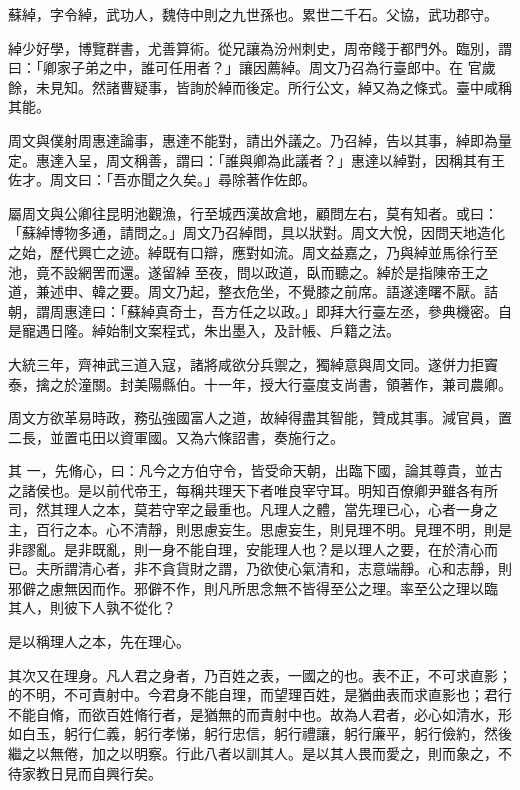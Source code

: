 \begin{pinyinscope}
 蘇綽，字令綽，武功人，魏侍中則之九世孫也。累世二千石。父協，武功郡守。



 綽少好學，博覽群書，尤善算術。從兄讓為汾州刺史，周帝餞于都門外。臨別，謂曰：「卿家子弟之中，誰可任用者？」讓因薦綽。周文乃召為行臺郎中。在
 官歲餘，未見知。然諸曹疑事，皆詢於綽而後定。所行公文，綽又為之條式。臺中咸稱其能。



 周文與僕射周惠達論事，惠達不能對，請出外議之。乃召綽，告以其事，綽即為量定。惠達入呈，周文稱善，謂曰：「誰與卿為此議者？」惠達以綽對，因稱其有王佐才。周文曰：「吾亦聞之久矣。」尋除著作佐郎。



 屬周文與公卿往昆明池觀漁，行至城西漢故倉地，顧問左右，莫有知者。或曰：「蘇綽博物多通，請問之。」周文乃召綽問，具以狀對。周文大悅，因問天地造化之始，歷代興亡之迹。綽既有口辯，應對如流。周文益嘉之，乃與綽並馬徐行至池，竟不設網罟而還。遂留綽
 至夜，問以政道，臥而聽之。綽於是指陳帝王之道，兼述申、韓之要。周文乃起，整衣危坐，不覺膝之前席。語遂達曙不厭。詰朝，謂周惠達曰：「蘇綽真奇士，吾方任之以政。」即拜大行臺左丞，參典機密。自是寵遇日隆。綽始制文案程式，朱出墨入，及計帳、戶籍之法。



 大統三年，齊神武三道入寇，諸將咸欲分兵禦之，獨綽意與周文同。遂併力拒竇泰，擒之於潼關。封美陽縣伯。十一年，授大行臺度支尚書，領著作，兼司農卿。



 周文方欲革易時政，務弘強國富人之道，故綽得盡其智能，贊成其事。減官員，置二長，並置屯田以資軍國。又為六條詔書，奏施行之。



 其
 一，先脩心，曰：凡今之方伯守令，皆受命天朝，出臨下國，論其尊貴，並古之諸侯也。是以前代帝王，每稱共理天下者唯良宰守耳。明知百僚卿尹雖各有所司，然其理人之本，莫若守宰之最重也。凡理人之體，當先理已心，心者一身之主，百行之本。心不清靜，則思慮妄生。思慮妄生，則見理不明。見理不明，則是非謬亂。是非既亂，則一身不能自理，安能理人也？是以理人之要，在於清心而已。夫所謂清心者，非不貪貨財之謂，乃欲使心氣清和，志意端靜。心和志靜，則邪僻之慮無因而作。邪僻不作，則凡所思念無不皆得至公之理。率至公之理以臨
 其人，則彼下人孰不從化？



 是以稱理人之本，先在理心。



 其次又在理身。凡人君之身者，乃百姓之表，一國之的也。表不正，不可求直影；的不明，不可責射中。今君身不能自理，而望理百姓，是猶曲表而求直影也；君行不能自脩，而欲百姓脩行者，是猶無的而責射中也。故為人君者，必心如清水，形如白玉，躬行仁義，躬行孝悌，躬行忠信，躬行禮讓，躬行廉平，躬行儉約，然後繼之以無倦，加之以明察。行此八者以訓其人。是以其人畏而愛之，則而象之，不待家教日見而自興行矣。




\end{pinyinscope}
